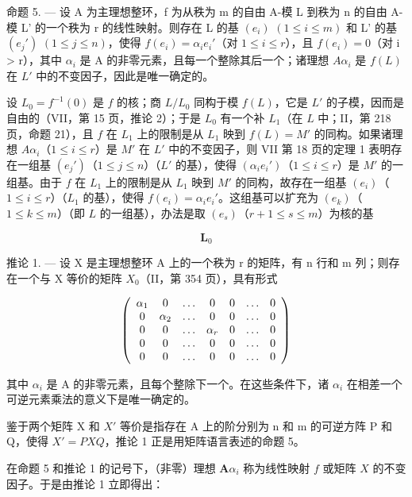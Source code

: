 命题 5. --- 设 A 为主理想整环，f 为从秩为 m 的自由 A-模 L 到秩为 n 的自由 A-模 L' 的一个秩为 r 的线性映射。则存在 L 的基 \((e_{i})\) \((1 \leqslant i \leqslant m)\) 和 L' 的基 \((e_{j}')\) \((1 \leqslant j \leqslant n)\)，使得 \(f(e_{i}) = \alpha_{i} e_{i}'\)（对 \(1 \leqslant i \leqslant r\)），且 \(f(e_{i}) = 0\)（对 i \textgreater{} r），其中 \(\alpha_{i}\) 是 A 的非零元素，且每一个整除其后一个；诸理想 \(A\alpha_{i}\) 是 \(f(L)\) 在 \(L'\) 中的不变因子，因此是唯一确定的。

设 \(L_0 = f^{-1}(0)\) 是 \(f\) 的核；商 \(L/L_0\) 同构于模 \(f(L)\)，它是 \(L'\) 的子模，因而是自由的（VII，第 15 页，推论 2）；于是 \(L_0\) 有一个补 \(L_1\)（在 \(L\) 中；II，第 218 页，命题 21），且 \(f\) 在 \(L_1\) 上的限制是从 \(L_1\) 映到 \(f(L) = M'\) 的同构。如果诸理想 \(A\alpha_i\)（\(1 \leqslant i \leqslant r\)）是 \(M'\) 在 \(L'\) 中的不变因子，则 VII 第 18 页的定理 1 表明存在一组基 \((e_j')\)（\(1 \leqslant j \leqslant n\)）（\(L'\) 的基），使得 \((\alpha_i e_i')\)（\(1 \leqslant i \leqslant r\)）是 \(M'\) 的一组基。由于 \(f\) 在 \(L_1\) 上的限制是从 \(L_1\) 映到 \(M'\) 的同构，故存在一组基 \((e_i)\)（\(1 \leqslant i \leqslant r\)）（\(L_1\) 的基），使得 \(f(e_i) = \alpha_i e_i'\)。这组基可以扩充为 \((e_k)\)（\(1 \leqslant k \leqslant m\)）（即 \(L\) 的一组基），办法是取 \((e_s)\)（\(r + 1 \leqslant s \leqslant m\)）为核的基

\[
\mathbf {L} _ {0}
\]

推论 1. --- 设 X 是主理想整环 A 上的一个秩为 r 的矩阵，有 n 行和 m 列；则存在一个与 X 等价的矩阵 \(X_{0}\)（II，第 354 页），具有形式

\[
\left( \begin{array}{c c c c c c c} \alpha_ {1} & 0 & \ldots & 0 & 0 & \ldots & 0 \\ 0 & \alpha_ {2} & \ldots & 0 & 0 & \ldots & 0 \\ 0 & 0 & \ldots & \alpha_ {r} & 0 & \ldots & 0 \\ 0 & 0 & \ldots & 0 & 0 & \ldots & 0 \\ 0 & 0 & \ldots & 0 & 0 & \ldots & 0 \end{array} \right)
\]

其中 \(\alpha_{i}\) 是 A 的非零元素，且每个整除下一个。在这些条件下，诸 \(\alpha_{i}\) 在相差一个可逆元素乘法的意义下是唯一确定的。

鉴于两个矩阵 X 和 \(X'\) 等价是指存在 A 上的阶分别为 n 和 m 的可逆方阵 P 和 Q，使得 \(X' = PXQ\)，推论 1 正是用矩阵语言表述的命题 5。

在命题 5 和推论 1 的记号下，（非零）理想 \(\mathbf{A}\alpha_{i}\) 称为线性映射 \(f\) 或矩阵 \(X\) 的不变因子。于是由推论 1 立即得出：

